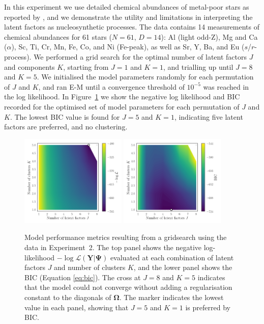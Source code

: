\documentclass[twocolumn]{aastex61}
\newcommand{\vect}[1]{\boldsymbol{\mathbf{#1}}}
\renewcommand{\vec}[1]{\vect{#1}}
\newcommand{\data}{\textbf{Y}}
\newcommand{\scorecovs}{\vec\Omega}
\begin{document}
In this experiment we use detailed chemical abundances of metal-poor stars as
reported by \citet{Barklem:2005}, and we demonstrate the utility and limitations
in interpreting the latent factors as nucleosynthetic processes. The data 
contains 14 measurements of chemical abundances for 61 stars ($N = 61$, $D = 14$): 
Al (light odd-Z), Mg and Ca ($\alpha$), Sc, Ti, Cr, Mn, Fe, Co, and Ni (Fe-peak),
as well as Sr, Y, Ba, and Eu ($s$/$r$-process). We performed a grid search for
the optimal number of latent factors $J$ and components $K$, starting from
$J = 1$ and $K = 1$, and trialling up until $J = 8$ and $K = 5$. We initialised
the model parameters randomly for each permutation of $J$ and $K$, and ran E-M
until a convergence threshold of $10^{-5}$ was reached in the log likelihood. 
In Figure~\ref{fig:exp2-gridsearch-contours} we show the negative log likelihood 
and BIC recorded for the optimised set of model parameters for each permutation 
of $J$ and $K$. The lowest BIC value is found for $J = 5$ and $K = 1$, indicating
five latent factors are preferred, and no clustering.

\begin{figure}
	\includegraphics[width=0.45\textwidth]{experiments/exp2-gridsearch-ll.png}
	\includegraphics[width=0.45\textwidth]{experiments/exp2-gridsearch-bic.png}
    \caption{Model performance metrics resulting from a gridsearch using the
    		 \citet{Barklem:2005} data in Experiment~2.
    		 The top panel shows the negative log-likelihood 
			 $-\log{\mathcal{L}\left(\data|\vec\Psi\right)}$ 
			 evaluated at each combination of latent factors $J$ and number 
			 of clusters $K$, and the lower panel shows the BIC (Equation \ref{eq:bic}).
			 The cross at
			 $J=8$ and $K=5$ indicates that the model could not converge without
			 adding a regularisation constant to the diagonals of $\scorecovs$.
			 The marker indicates the lowest value in each panel, showing that
			 $J = 5$ and $K = 1$ is preferred by BIC.}
    \label{fig:exp2-gridsearch-contours}
\end{figure}
\end{document}
